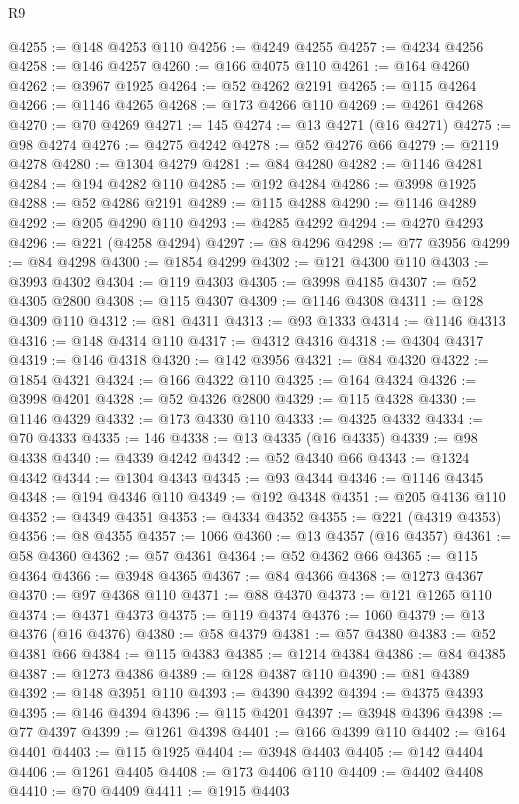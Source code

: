 \begin{lexlean}{R9}
\begin{coremodule}
@4255 := @148 @4253 @110
@4256 := @4249 @4255
@4257 := @4234 @4256
@4258 := @146 @4257
@4260 := @166 @4075 @110
@4261 := @164 @4260
@4262 := @3967 @1925
@4264 := @52 @4262 @2191
@4265 := @115 @4264
@4266 := @1146 @4265
@4268 := @173 @4266 @110
@4269 := @4261 @4268
@4270 := @70 @4269
@4271 := 145
@4274 := @13 @4271 (@16 @4271)
@4275 := @98 @4274
@4276 := @4275 @4242
@4278 := @52 @4276 @66
@4279 := @2119 @4278
@4280 := @1304 @4279
@4281 := @84 @4280
@4282 := @1146 @4281
@4284 := @194 @4282 @110
@4285 := @192 @4284
@4286 := @3998 @1925
@4288 := @52 @4286 @2191
@4289 := @115 @4288
@4290 := @1146 @4289
@4292 := @205 @4290 @110
@4293 := @4285 @4292
@4294 := @4270 @4293
@4296 := @221 (@4258 @4294)
@4297 := @8 @4296
@4298 := @77 @3956
@4299 := @84 @4298
@4300 := @1854 @4299
@4302 := @121 @4300 @110
@4303 := @3993 @4302
@4304 := @119 @4303
@4305 := @3998 @4185
@4307 := @52 @4305 @2800
@4308 := @115 @4307
@4309 := @1146 @4308
@4311 := @128 @4309 @110
@4312 := @81 @4311
@4313 := @93 @1333
@4314 := @1146 @4313
@4316 := @148 @4314 @110
@4317 := @4312 @4316
@4318 := @4304 @4317
@4319 := @146 @4318
@4320 := @142 @3956
@4321 := @84 @4320
@4322 := @1854 @4321
@4324 := @166 @4322 @110
@4325 := @164 @4324
@4326 := @3998 @4201
@4328 := @52 @4326 @2800
@4329 := @115 @4328
@4330 := @1146 @4329
@4332 := @173 @4330 @110
@4333 := @4325 @4332
@4334 := @70 @4333
@4335 := 146
@4338 := @13 @4335 (@16 @4335)
@4339 := @98 @4338
@4340 := @4339 @4242
@4342 := @52 @4340 @66
@4343 := @1324 @4342
@4344 := @1304 @4343
@4345 := @93 @4344
@4346 := @1146 @4345
@4348 := @194 @4346 @110
@4349 := @192 @4348
@4351 := @205 @4136 @110
@4352 := @4349 @4351
@4353 := @4334 @4352
@4355 := @221 (@4319 @4353)
@4356 := @8 @4355
@4357 := 1066
@4360 := @13 @4357 (@16 @4357)
@4361 := @58 @4360
@4362 := @57 @4361
@4364 := @52 @4362 @66
@4365 := @115 @4364
@4366 := @3948 @4365
@4367 := @84 @4366
@4368 := @1273 @4367
@4370 := @97 @4368 @110
@4371 := @88 @4370
@4373 := @121 @1265 @110
@4374 := @4371 @4373
@4375 := @119 @4374
@4376 := 1060
@4379 := @13 @4376 (@16 @4376)
@4380 := @58 @4379
@4381 := @57 @4380
@4383 := @52 @4381 @66
@4384 := @115 @4383
@4385 := @1214 @4384
@4386 := @84 @4385
@4387 := @1273 @4386
@4389 := @128 @4387 @110
@4390 := @81 @4389
@4392 := @148 @3951 @110
@4393 := @4390 @4392
@4394 := @4375 @4393
@4395 := @146 @4394
@4396 := @115 @4201
@4397 := @3948 @4396
@4398 := @77 @4397
@4399 := @1261 @4398
@4401 := @166 @4399 @110
@4402 := @164 @4401
@4403 := @115 @1925
@4404 := @3948 @4403
@4405 := @142 @4404
@4406 := @1261 @4405
@4408 := @173 @4406 @110
@4409 := @4402 @4408
@4410 := @70 @4409
@4411 := @1915 @4403

\end{coremodule}
\end{lexlean}
